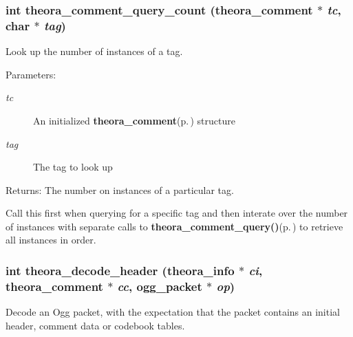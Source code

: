 \subsubsection{\setlength{\rightskip}{0pt plus 5cm}int theora\_\-comment\_\-query\_\-count ({\bf theora\_\-comment} $\ast$ {\em tc}, char $\ast$ {\em tag})}\label{theora_8h_d0ee4a15b96518d5d8ab38df814c0b27}


Look up the number of instances of a tag. 

\begin{Desc}
\item[Parameters:]
\begin{description}
\item[{\em tc}]An initialized {\bf theora\_\-comment}{\rm (p.\,\pageref{structtheora__comment})} structure \item[{\em tag}]The tag to look up \end{description}
\end{Desc}
\begin{Desc}
\item[Returns:]The number on instances of a particular tag.\end{Desc}
Call this first when querying for a specific tag and then interate over the number of instances with separate calls to {\bf theora\_\-comment\_\-query()}{\rm (p.\,\pageref{theora_8h_0071768c54009941f50d7c738a33340d})} to retrieve all instances in order. 
\subsubsection{\setlength{\rightskip}{0pt plus 5cm}int theora\_\-decode\_\-header ({\bf theora\_\-info} $\ast$ {\em ci}, {\bf theora\_\-comment} $\ast$ {\em cc}, ogg\_\-packet $\ast$ {\em op})}\label{theora_8h_41a60c67649c41ae88278d777f89ee3f}


Decode an Ogg packet, with the expectation that the packet contains an initial header, comment data or codebook tables. 

